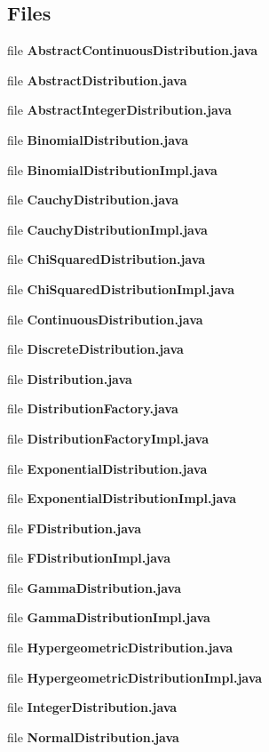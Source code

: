 \subsection*{Files}
\begin{DoxyCompactItemize}
\item 
file {\bfseries Abstract\-Continuous\-Distribution.\-java}
\item 
file {\bfseries Abstract\-Distribution.\-java}
\item 
file {\bfseries Abstract\-Integer\-Distribution.\-java}
\item 
file {\bfseries Binomial\-Distribution.\-java}
\item 
file {\bfseries Binomial\-Distribution\-Impl.\-java}
\item 
file {\bfseries Cauchy\-Distribution.\-java}
\item 
file {\bfseries Cauchy\-Distribution\-Impl.\-java}
\item 
file {\bfseries Chi\-Squared\-Distribution.\-java}
\item 
file {\bfseries Chi\-Squared\-Distribution\-Impl.\-java}
\item 
file {\bfseries Continuous\-Distribution.\-java}
\item 
file {\bfseries Discrete\-Distribution.\-java}
\item 
file {\bfseries Distribution.\-java}
\item 
file {\bfseries Distribution\-Factory.\-java}
\item 
file {\bfseries Distribution\-Factory\-Impl.\-java}
\item 
file {\bfseries Exponential\-Distribution.\-java}
\item 
file {\bfseries Exponential\-Distribution\-Impl.\-java}
\item 
file {\bfseries F\-Distribution.\-java}
\item 
file {\bfseries F\-Distribution\-Impl.\-java}
\item 
file {\bfseries Gamma\-Distribution.\-java}
\item 
file {\bfseries Gamma\-Distribution\-Impl.\-java}
\item 
file {\bfseries Hypergeometric\-Distribution.\-java}
\item 
file {\bfseries Hypergeometric\-Distribution\-Impl.\-java}
\item 
file {\bfseries Integer\-Distribution.\-java}
\item 
file {\bfseries Normal\-Distribution.\-java}
\item 

\end{DoxyCompactItemize}
